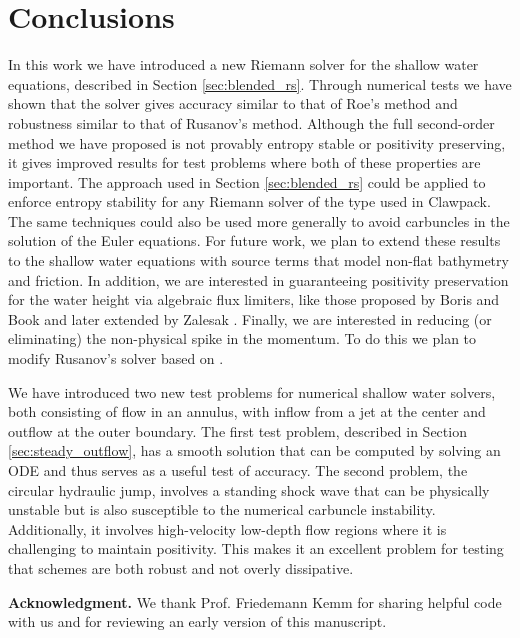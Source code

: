 \documentclass[preprint, 11pt]{article}
\begin{document}




\section{Conclusions}\label{sec:conclusion}
In this work we have introduced a new Riemann solver for the shallow water
equations, described in Section \ref{sec:blended_rs}.  Through numerical tests we have
shown that the solver gives accuracy similar to that of Roe's method and
robustness similar to that of Rusanov's method.  Although the full
second-order method we have proposed is not provably entropy stable or
positivity preserving, it gives improved results for test problems
where both of these properties are important.  The approach used in Section
\ref{sec:blended_rs} could be applied to enforce entropy stability for any Riemann
solver of the type used in Clawpack.  The same techniques could also
be used more generally to avoid carbuncles in the solution of the
Euler equations.
{\color{OliveGreen}
  For future work, we plan to extend these results to the shallow water equations 
  with source terms that model non-flat bathymetry and friction. In addition, we 
  are interested in guaranteeing positivity preservation for the water height
  via algebraic flux limiters, like those proposed by Boris and Book \cite{boris1973flux} 
  and later extended by Zalesak \cite{zalesak1979fully}.
  Finally, we are interested in reducing (or eliminating) the non-physical spike in
  the momentum. To do this we plan to modify Rusanov's solver based on \cite[Section 5.1]{navas2019improved}. 
}
  

We have introduced two new test problems for numerical shallow water solvers,
both consisting of flow in an annulus, with inflow from a jet
at the center and outflow at the outer boundary.  The first test
problem, described in Section \ref{sec:steady_outflow}, has a smooth solution that can
be computed by solving an ODE and thus serves as a useful test of
accuracy.  The second problem, the circular hydraulic jump, involves
a standing shock wave that can be physically unstable but is
also susceptible to the numerical carbuncle instability.
Additionally, it involves high-velocity low-depth flow regions where
it is challenging to maintain positivity.
This makes it an excellent problem for testing that schemes are both
robust and not overly dissipative.


{\bf Acknowledgment.}  We thank Prof. Friedemann Kemm for sharing helpful code
with us and for reviewing an early version of this manuscript.
%


\end{document}
